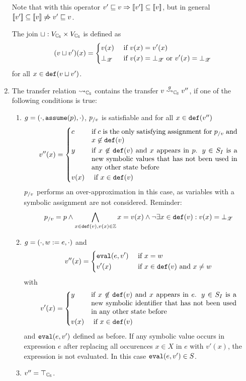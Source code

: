 \begin{enumerate}[leftmargin=*, label=\arabic*.]
	Note that with this operator $v' \sqsubseteq v \Rightarrow [\![ v' ]\!] \subseteq [\![ v ]\!]$, but in general $[\![ v' ]\!] \subseteq [\![ v ]\!] \not\Rightarrow v' \sqsubseteq v$.

	The join $\sqcup : V_{\mathbb{C_{S}}} \times V_{\mathbb{C_{S}}}$ is defined as
	\[(v \sqcup v')(x) = \begin{dcases}
		v(x) & \text{ if } v(x) = v'(x)\\
		\bot_{\mathscr{Z}} & \text{ if } v(x) = \bot_{\mathscr{Z}} \text{ or } v'(x) = \bot_{\mathscr{Z}}
	\end{dcases}\]
	for all $x \in \texttt{def}(v \sqcup v')$.

\item The transfer relation $\rightsquigarrow_{\mathbb{C_{S}}}$ contains the transfer $v \overset{g}{\rightsquigarrow}_{\mathbb{C_{S}}} v''$, if one of the following conditions is true:
	\begin{enumerate}[label = \alph*)]
		\item $g = (\cdot, \texttt{assume}(p), \cdot)$, $p_{/v}$ is satisfiable and for all $x \in \texttt{def}(v'')$
			\[ v''(x) = \begin{dcases}
				c & \parbox[t]{.6\textwidth}{ if $c$ is the only satisfying assignment for $p_\using{v}$ and $x \not\in \defRange(v)$}\\
				y & \parbox[t]{.6\textwidth}{ if $x \not\in \defRange(v)$ and $x$  appears in $p$. $y \in \symIds$ is a new symbolic values that has not been used in any other state before}\\
				v(x) & \text{ if } x \in \defRange(v)
			\end{dcases}\]
			$p_{/v}$ performs an over-approximation in this case, as variables with a symbolic assignment are not considered.
			Reminder: \[p_{/v} = p \wedge \bigwedge\limits_{x \in \texttt{def}(v), v(x) \in \mathbb{Z}}  x = v(x) \wedge \neg \exists x \in \texttt{def}(v) : v(x) = \bot_{\mathscr{Z}}\]

		\item $g = (\cdot, w := e, \cdot)$ and
			\[ v''(x) = \begin{dcases}
				\texttt{eval}(e, v') & \text{ if } x = w\\
				v'(x) & \text{ if } x \in \texttt{def}(v) \text{ and } x \neq w
			\end{dcases}\]
			with
			\[v'(x) = \begin{dcases}
				y & \parbox[t]{.6\textwidth}{if $x \not \in \defRange(v)$ and $x$ appears in $e$. $y \in \symIds$ is a new symbolic identifier that has not been used in any other state before}\\
				v(x) & \text{ if } x \in \defRange(v)
			\end{dcases}\]
			and $\texttt{eval}(e, v')$ defined as before. If any symbolic value occurs in expression $e$ after replacing all occurences $x \in X$ in $e$ with $v'(x)$,
			the expression is not evaluated. In this case $\texttt{eval}(e, v') \in S$.
		\item $v'' = \top_{\mathbb{C_{S}}}$.
	\end{enumerate}


\end{enumerate}
